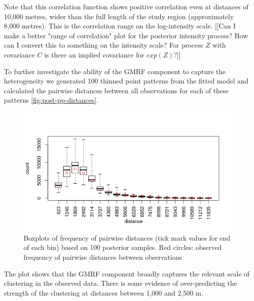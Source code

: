 \documentclass[preprint,12pt]{elsarticle}
\begin{document}
Note that this correlation function shows positive correlation even at distances of 10,000 metres, wider than the full length of the study region (approximately 8,000 metres).  This is the correlation range on the log-intensity scale.  [[Can I make a better "range of correlation" plot for the posterior intensity process?  How can I convert this to something on the intensity scale?  For process $Z$ with covariance $C$ is there an implied covariance for $exp(Z)$?]]

To further investigate the ability of the GMRF component to capture the heterogeneity we generated 100 thinned point patterns from the fitted model and calculated the pairwise distances between all observations for each of these patterns \autoref{fig:post-pp-distances}.  
\begin{figure}[h]
	\begin{center}
		\includegraphics[scale=0.6]{figures/post_pp_distances.png}
		\caption{Boxplots of frequency of pairwise distances (tick mark values for end of each bin) based on 100 posterior samples.  Red circles: observed frequency of pairwise distances between observations}
		\label{fig:post-pp-distances}
	\end{center}
\end{figure}
The plot shows that the GMRF component broadly captures the relevant scale of clustering in the observed data.  There is some evidence of over-predicting the strength of the clustering at distances between 1,000 and 2,500 m.  
\end{document}
